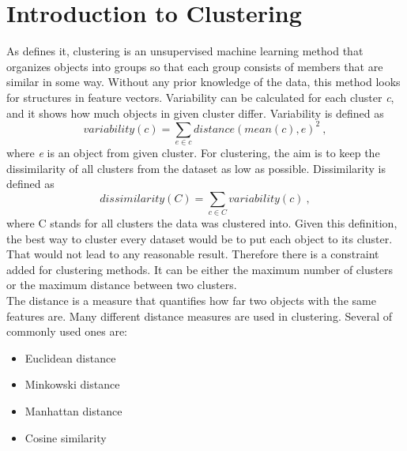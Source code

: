 \documentclass[thesis=B,english]{FITthesis}[2012/10/20]
\begin{document}
\section{Introduction to Clustering}\label{sec:clust_intro}
As \cite{guttag2016introduction} defines it, clustering is an unsupervised machine learning method that organizes objects into groups so that each group consists of members that are similar in some way.
Without any prior knowledge of the data, this method looks for structures in feature vectors.
Variability can be calculated for each cluster \textit{c}, and it shows how much objects in given cluster differ.
Variability is defined as $$ variability(c) = \sum_{e \in c} distance(mean(c), e)^2\:,$$ where \textit{e} is an object from given cluster.
For clustering, the aim is to keep the dissimilarity of all clusters from the dataset as low as possible.
Dissimilarity is defined as $$ dissimilarity(C) = \sum_{c \in C} variability(c)\:,$$ where C stands for all clusters the data was clustered into.
Given this definition, the best way to cluster every dataset would be to put each object to its cluster.
That would not lead to any reasonable result.
Therefore there is a constraint added for clustering methods.                     
It can be either the maximum number of clusters or the maximum distance between two clusters. \\
                                                                                                                                      
The distance is a measure that quantifies how far two objects with the same features are.
Many different distance measures are used in clustering.                          
Several of commonly used ones are:                                                
\begin{itemize}                                                                   
    \item Euclidean distance                                                      
    \item Minkowski distance                                                      
    \item Manhattan distance                                                      
    \item Cosine similarity                                                       
\end{itemize}  
                                                                                  
\end{document}
